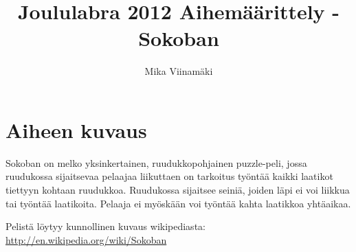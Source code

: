 \documentclass{article}
\begin{document}
\title{Joululabra 2012 Aihemäärittely - Sokoban}
\author{Mika Viinamäki}
\maketitle

\section{Aiheen kuvaus}
Sokoban on melko yksinkertainen, ruudukkopohjainen puzzle-peli, jossa ruudukossa sijaitsevaa pelaajaa liikuttaen on tarkoitus työntää kaikki laatikot tiettyyn kohtaan ruudukkoa. Ruudukossa sijaitsee seiniä, joiden läpi ei voi liikkua tai työntää laatikoita. Pelaaja ei myöskään voi työntää kahta laatikkoa yhtäaikaa.

Pelistä löytyy kunnollinen kuvaus wikipediasta: \url{http://en.wikipedia.org/wiki/Sokoban}
\end{document}
